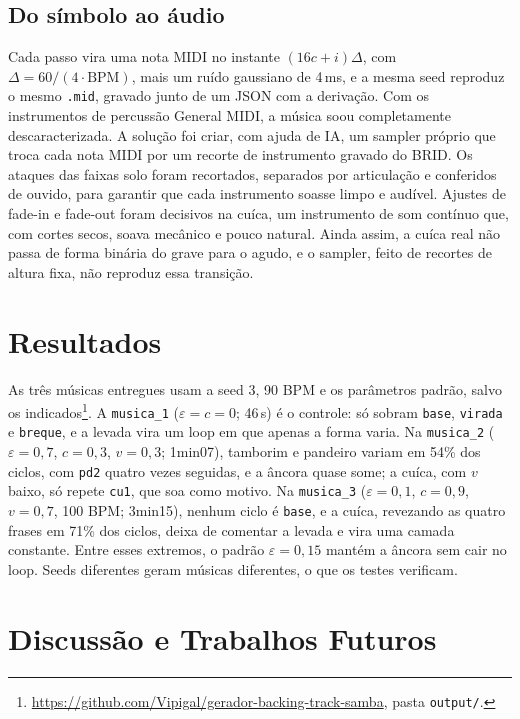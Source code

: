 \documentclass{article}
\newcommand{\tm}[1]{\texttt{#1}}      %
\begin{document}
\subsection{Do símbolo ao áudio}\label{sec:audio}

Cada passo vira uma nota MIDI no instante $(16c+i)\Delta$, com
$\Delta = 60/(4\cdot\mathrm{BPM})$, mais um ruído gaussiano de 4\,ms, e a mesma seed
reproduz o mesmo \texttt{.mid}, gravado junto de um JSON com a derivação.
Com os instrumentos de percussão General MIDI, a música soou completamente
descaracterizada. A solução foi criar, com ajuda de IA, um sampler próprio que troca cada
nota MIDI por um recorte de instrumento gravado do BRID. Os ataques das faixas solo foram
recortados, separados por articulação e conferidos de ouvido, para garantir que cada
instrumento soasse limpo e audível. Ajustes de fade-in e fade-out foram decisivos na cuíca,
um instrumento de som contínuo que, com cortes secos, soava mecânico e pouco natural. Ainda
assim, a cuíca real não passa de forma binária do grave para o agudo, e o sampler, feito de
recortes de altura fixa, não reproduz essa transição.

\section{Resultados}\label{sec:resultados}

As três músicas entregues usam a seed 3, 90 BPM e os parâmetros padrão, salvo os
indicados\footnote{\url{https://github.com/Vipigal/gerador-backing-track-samba}, pasta
\texttt{output/}.}. A \texttt{musica\_1}
($\varepsilon=c=0$; 46\,s) é o controle: só sobram \tm{base}, \tm{virada} e \tm{breque}, e a
levada vira um loop em que apenas a forma varia. Na \texttt{musica\_2} ($\varepsilon=0{,}7$,
$c=0{,}3$, $v=0{,}3$; 1min07), tamborim e pandeiro variam em 54\% dos ciclos, com \tm{pd2}
quatro vezes seguidas, e a âncora quase some; a cuíca, com $v$ baixo, só repete \tm{cu1},
que soa como motivo. Na \texttt{musica\_3} ($\varepsilon=0{,}1$, $c=0{,}9$, $v=0{,}7$,
100 BPM; 3min15), nenhum ciclo é \tm{base}, e a cuíca, revezando as quatro frases em 71\%
dos ciclos, deixa de comentar a levada e vira uma camada constante. Entre esses extremos, o
padrão $\varepsilon=0{,}15$ mantém a âncora sem cair no
loop. Seeds diferentes geram músicas diferentes, o que os
testes verificam.

\section{Discussão e Trabalhos Futuros}\label{sec:discussao}
\end{document}
